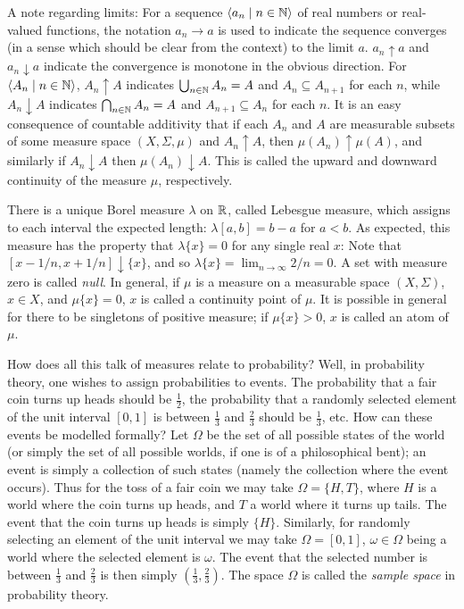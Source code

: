 \documentclass[leqno]{article}
\theoremstyle{definition}
\newcommand{\bldseq}[2]{\langle{#1}\mid{#2}\rangle}
\begin{document}
A note regarding limits: For a sequence $\bldseq{a_n}{n \in \N}$ of real numbers or real-valued functions, the notation $a_n \rightarrow a$ is used to indicate the sequence converges (in a sense which should be clear from the context) to the limit $a$. $a_n \uparrow a$ and $a_n \downarrow a$ indicate the convergence is monotone in the obvious direction. For $\bldseq{A_n}{n \in \N}$, $A_n \uparrow A$ indicates $\bigcup_{n \in \mathbb{N}} A_n = A$ and $A_n \subseteq A_{n+1}$ for each $n$, while $A_n \downarrow A$ indicates $\bigcap_{n \in \mathbb{N}} A_n = A$ and $A_{n+1} \subseteq A_n$ for each $n$. It is an easy consequence of countable additivity that if each $A_n$ and $A$ are measurable subsets of some measure space $(X, \Sigma, \mu)$ and $A_n \uparrow A$, then $\mu(A_n) \uparrow \mu(A)$, and similarly if $A_n \downarrow A$ then $\mu(A_n) \downarrow A$. This is called the upward and downward continuity of the measure $\mu$, respectively.

There is a unique Borel measure $\lambda$ on $\mathbb{R}$, called Lebesgue measure, which assigns to each interval the expected length: $\lambda [a,b] = b - a$ for $a < b$. As expected, this measure has the property that $\lambda \{x\} = 0$ for any single real $x$: Note that $[x - 1/n, x + 1/n] \downarrow \{x\}$, and so $\lambda \{x\} = \lim_{n \rightarrow \infty} 2/n = 0$. A set with measure zero is called {\em null}. In general, if $\mu$ is a measure on a measurable space $(X, \Sigma)$, $x \in X$, and $\mu \{x\} = 0$, $x$ is called a continuity point of $\mu$. It is possible in general for there to be singletons of positive measure; if $\mu \{x\} > 0$, $x$ is called an atom of $\mu$.

\medskip

How does all this talk of measures relate to probability? Well, in probability theory, one wishes to assign probabilities to events. The probability that a fair coin turns up heads should be $\frac{1}{2}$, the probability that a randomly selected element of the unit interval $[0,1]$ is between $\frac{1}{3}$ and $\frac{2}{3}$ should be $\frac{1}{3}$, etc. How can these events be modelled formally? Let $\Omega$ be the set of all possible states of the world (or simply the set of all possible worlds, if one is of a philosophical bent); an event is simply a collection of such states (namely the collection where the event occurs). Thus for the toss of a fair coin we may take $\Omega = \{H, T\}$, where $H$ is a world where the coin turns up heads, and $T$ a world where it turns up tails. The event that the coin turns up heads is simply $\{H\}$. Similarly, for randomly selecting an element of the unit interval we may take $\Omega = [0,1]$, $\omega \in \Omega$ being a world where the selected element is $\omega$. The event that the selected number is between $\frac{1}{3}$ and $\frac{2}{3}$ is then simply $(\frac{1}{3}, \frac{2}{3})$. The space $\Omega$ is called the {\em sample space} in probability theory.
\end{document}
